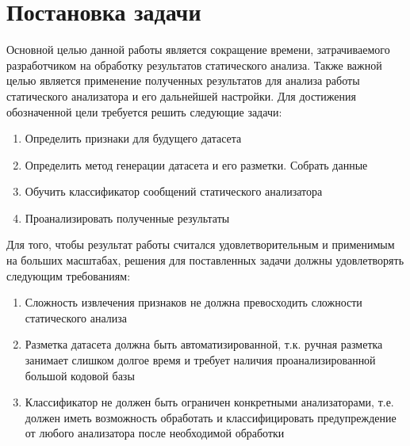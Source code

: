 \chapter{Постановка задачи}
\label{sec:Chapter1} 

Основной целью данной работы является сокращение времени, затрачиваемого разработчиком на обработку результатов статического анализа. Также важной целью является применение полученных результатов для анализа работы статического анализатора и его дальнейшей настройки. Для достижения обозначенной цели требуется решить следующие задачи:

\begin{enumerate}
    \item Определить признаки для будущего датасета
    \item Определить метод генерации датасета и его разметки. Собрать данные
    \item Обучить классификатор сообщений статического анализатора
    \item Проанализировать полученные результаты
\end{enumerate}

Для того, чтобы результат работы считался удовлетворительным и применимым на больших масштабах, решения для поставленных задачи должны удовлетворять следующим требованиям:

\begin{enumerate}
    \item Сложность извлечения признаков не должна превосходить сложности статического анализа
    \item Разметка датасета должна быть автоматизированной, т.к. ручная разметка занимает слишком долгое время и требует наличия проанализированной большой кодовой базы \cite{Ayewah2010TheGF}
    \item Классификатор не должен быть ограничен конкретными анализаторами, т.е. должен иметь возможность обработать и классифицировать предупреждение от любого анализатора после необходимой обработки
\end{enumerate}

\newpage
